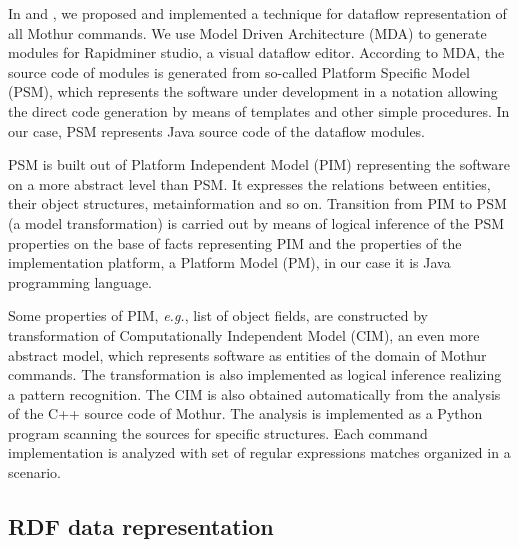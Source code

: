 \documentclass[a4paper]{jpconf}
\begin{document}

In \cite{cherk19} and \cite{zont19}, we proposed and implemented a technique for dataflow representation of all Mothur commands.  We use Model Driven Architecture (MDA) to generate modules for Rapidminer studio, a visual dataflow editor.  According to MDA, the source code of modules is generated from so-called Platform Specific Model (PSM), which represents the software under development in a notation allowing the direct code generation by means of templates and other simple procedures.  In our case, PSM represents Java source code of the dataflow modules.

PSM is built out of Platform Independent Model (PIM) representing the software on a more abstract level than PSM.  It expresses the relations between entities, their object structures, metainformation and so on.  Transition from PIM to PSM (a model transformation) is carried out by means of logical inference of the PSM properties on the base of facts representing PIM and the properties of the implementation platform, a Platform Model (PM), in our case it is Java programming language.

Some properties of PIM, \emph{e.g.}, list of object fields, are constructed by transformation of Computationally Independent Model (CIM), an even more abstract model, which represents software as entities of the domain of Mothur commands.  The transformation is also implemented as logical inference realizing a pattern recognition.  The CIM is also obtained automatically from the analysis of the C++ source code of Mothur. The analysis is implemented as a Python program scanning the sources for specific structures.  Each command implementation is analyzed with set of regular expressions matches organized in a scenario.

\subsection{RDF data representation}
\end{document}
